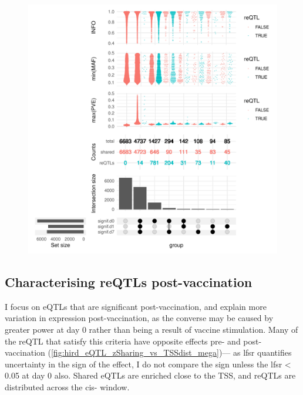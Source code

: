 \begin{figure}
    \centering
    \includegraphics[width=1.0\textwidth]{mainmatter/figures/chapter_03/compare_dge_eqtl.upset.pdf}
    \caption{}
    \label{fig:hird_eQTL_upset_mega}
\end{figure}


\subsection{Characterising reQTLs post-vaccination}

I focus on \glspl{eQTL} that are significant post-vaccination, and explain more variation in expression post-vaccination, as the converse may be caused by greater power at day 0 rather than being a result of vaccine stimulation.
Many of the \gls{reQTL} that satisfy this criteria have opposite effects pre- and post-vaccination (\autoref{fig:hird_eQTL_zSharing_vs_TSSdist_mega})---
as lfsr quantifies uncertainty in the sign of the effect, I do not compare the sign unless the lfsr < 0.05 at day 0 also.
Shared \glspl{eQTL} are enriched close to the \gls{TSS}, and \glspl{reQTL} are distributed across the cis- window.


